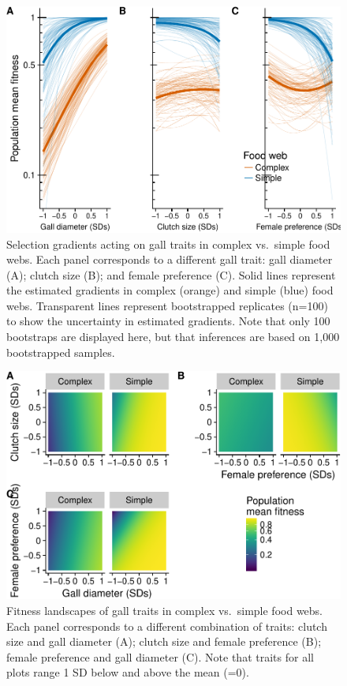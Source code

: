 \documentclass[]{elsarticle} %
\makeatletter
\def\maxwidth{\ifdim\Gin@nat@width>\linewidth\linewidth
\else\Gin@nat@width\fi}
\let\Oldincludegraphics\includegraphics
\renewcommand{\includegraphics}[1]{\Oldincludegraphics[width=\maxwidth]{#1}}
\makeatother
\begin{document}
\begin{figure}
\centering
\includegraphics{elsevier_test_files/figure-latex/Univariate_Landscapes-1.pdf}
\caption{\label{fig:Univariate_Landscapes}Selection gradients acting on
gall traits in complex vs.~simple food webs. Each panel corresponds to a
different gall trait: gall diameter (A); clutch size (B); and female
preference (C). Solid lines represent the estimated gradients in complex
(orange) and simple (blue) food webs. Transparent lines represent
bootstrapped replicates (n=100) to show the uncertainty in estimated
gradients. Note that only 100 bootstraps are displayed here, but that
inferences are based on 1,000 bootstrapped samples.}
\end{figure}

\begin{figure}
\centering
\includegraphics{elsevier_test_files/figure-latex/Multivariate_Landscapes-1.pdf}
\caption{\label{fig:Multivariate_Landscapes}Fitness landscapes of gall
traits in complex vs.~simple food webs. Each panel corresponds to a
different combination of traits: clutch size and gall diameter (A);
clutch size and female preference (B); female preference and gall
diameter (C). Note that traits for all plots range 1 SD below and above
the mean (=0).}
\end{figure}
\end{document}
